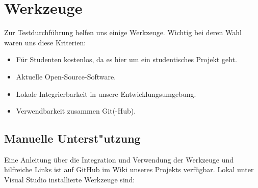 %



\section{Werkzeuge}
\label{Abschnitt:Tests:Werkzeuge}

Zur Testdurchführung helfen uns einige Werkzeuge. Wichtig bei deren Wahl waren uns diese Kriterien:

\begin{itemize}

	\item Für Studenten kostenlos, da es hier um ein studentisches Projekt geht.
	\item Aktuelle Open-Source-Software.
	\item Lokale Integrierbarkeit in unsere Entwicklungsumgebung.
	\item Verwendbarkeit zusammen Git(-Hub).
	

\end{itemize}



\subsection{Manuelle Unterst{"u}tzung}
\label{Abschnitt:Programmfehler:Werkzeuge:Manuell}

Eine Anleitung über die Integration und Verwendung der Werkzeuge und hilfreiche Links ist auf GitHub im Wiki unseres Projekts verfügbar. Lokal unter Visual Studio installierte Werkzeuge sind:
\\
\\

